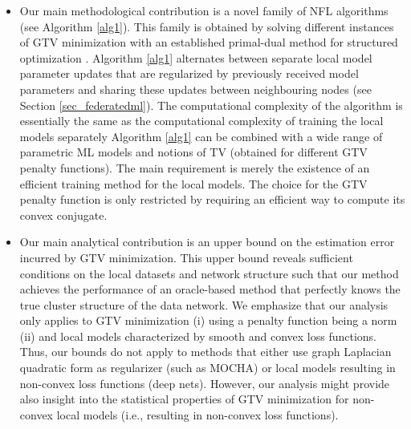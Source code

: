 \documentclass[lettersize,journal]{IEEEtran}
\begin{document}
\begin{itemize}
\item Our main methodological contribution is a novel family of NFL algorithms (see Algorithm \ref{alg1}). 
This family is obtained by solving different instances of GTV minimization with an established primal-dual method for structured optimization \cite{Condat2013}. 
Algorithm \ref{alg1} alternates between separate local model parameter updates that are regularized by previously
received model parameters and sharing these updates between 
neighbouring nodes (see Section \ref{sec_federatedml}).
The computational complexity of the algorithm is essentially the same as the computational complexity of training the local models separately 
Algorithm \ref{alg1} can be combined with a wide range of 
parametric ML models and notions of TV (obtained for different GTV penalty functions). The main requirement 
is merely the existence of an efficient training method for 
the local models. The choice for the GTV penalty function is only restricted by requiring an efficient 
way to compute its convex conjugate. 
\item Our main analytical contribution is an upper bound on the estimation error incurred by GTV minimization. 
This upper bound reveals sufficient conditions on the local datasets and network structure such 
that our method achieves the performance of an oracle-based method that perfectly knows the true  
cluster structure of the data network. We emphasize that our analysis only applies to GTV minimization 
(i) using a penalty function being a norm (ii) and local models characterized by smooth and convex loss functions. 
Thus, our bounds do not apply to methods that either use graph Laplacian quadratic form 
as regularizer (such as MOCHA) or local models resulting in non-convex loss functions (deep nets). 
However, our analysis might provide also insight into the statistical properties of GTV minimization for 
non-convex local models (i.e., resulting in non-convex loss functions). 
\end{itemize}
\end{document}
